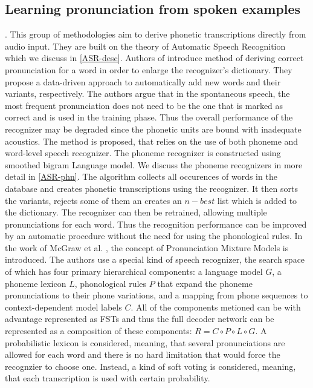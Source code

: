 \subsection{Learning pronunciation from spoken examples}. 
This group of methodologies aim to derive phonetic transcriptions directly from audio input.
They are built on the theory of Automatic Speech Recognition which we discuss in \ref{ASR-desc}.
Authors of \cite{slobada1996dictionary} introduce method of deriving correct pronunciation for a word in order to enlarge the recognizer's dictionary.
They propose a data-driven approach to automatically add new words and their variants, respectively.
The authors argue that in the spontaneous speech, the most frequent pronunciation does not need to be the one that is marked as correct and is used in the training phase.
Thus the overall performance of the recognizer may be degraded since the phonetic units are bound with inadequate acoustics.
The method is proposed, that relies on the use of both phoneme and word-level speech recognizer.
The phoneme recognizer is constructed using smoothed bigram Language model.
We discuss the phoneme recognizers in more detail in \ref{ASR-phn}.
The algorithm collects all occurences of words in the database and creates phonetic transcriptions using the recognizer.
It then sorts the variants, rejects some of them an creates an $n-best$ list which is added to the dictionary.
The recognizer can then be retrained, allowing multiple pronunciations for each word.
Thus the recognition performance can be improved by an automatic procedure without the need for using the phonological rules.
\linebreak\linebreak
In the work of McGraw et al. \cite{mcgraw2013learning}, the concept of Pronunciation Mixture Models is introduced.
The authors use a special kind of speech recognizer, the search space of which has four primary hierarchical components: a language model $G$, a phoneme lexicon $L$, phonological rules $P$ that expand the phoneme pronunciations to their phone variations, and a mapping from phone sequences to context-dependent model labels
$C$.
All of the components metioned can be with advantage represented as FSTs and thus the full decoder network can be represented as a composition of these components: $R = C\circ P \circ L \circ G$.
A probabilistic lexicon is considered, meaning, that several pronunciations are allowed for each word and there is no hard limitation that would force the recognzier to choose one.
Instead, a kind of soft voting is considered, meaning, that each transcription is used with certain probability.
